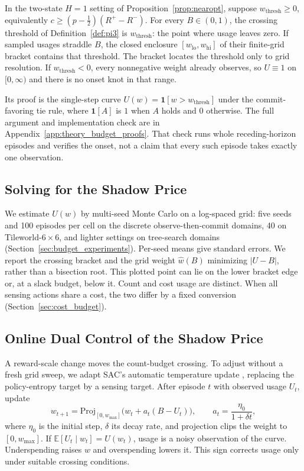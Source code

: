 \documentclass[runningheads]{llncs}
\begin{document}
\begin{corollary}
\label{cor:pi4}
In the two-state $H{=}1$ setting of Proposition~\ref{prop:nearopt}, suppose $w_{\mathrm{thresh}}\geq0$, equivalently $c\geq(p-\tfrac12)(R^+-R^-)$. For every $B\in(0,1)$, the crossing threshold of Definition~\ref{def:pi3} is $w_{\mathrm{thresh}}$: the point where usage leaves zero. If sampled usages straddle $B$, the closed enclosure $[w_{\mathrm{lo}},w_{\mathrm{hi}}]$ of their finite-grid bracket contains that threshold. The bracket locates the threshold only to grid resolution. If $w_{\mathrm{thresh}}<0$, every nonnegative weight already observes, so $U\equiv1$ on $[0,\infty)$ and there is no onset knot in that range.
\end{corollary}

Its proof is the single-step curve $U(w)=\mathbf{1}[w>w_{\mathrm{thresh}}]$ under the commit-favoring tie rule, where $\mathbf{1}[A]$ is $1$ when $A$ holds and $0$ otherwise. The full argument and implementation check are in Appendix~\ref{app:theory_budget_proofs}. That check runs whole receding-horizon episodes and verifies the onset, not a claim that every such episode takes exactly one observation.

\subsection{Solving for the Shadow Price}
\label{sec:budget_solve}

We estimate $U(w)$ by multi-seed Monte Carlo on a log-spaced grid: five seeds and 100 episodes per cell on the discrete observe-then-commit domains, 40 on Tileworld-$6\times6$, and lighter settings on tree-search domains (Section~\ref{sec:budget_experiments}). Per-seed means give standard errors. We report the crossing bracket and the grid weight $\hat w(B)$ minimizing $|U-B|$, rather than a bisection root. This plotted point can lie on the lower bracket edge or, at a slack budget, below it. Count and cost usage are distinct. When all sensing actions share a cost, the two differ by a fixed conversion (Section~\ref{sec:cost_budget}).

\subsection{Online Dual Control of the Shadow Price}
\label{sec:pi5}

A reward-scale change moves the count-budget crossing. To adjust without a fresh grid sweep, we adapt SAC's automatic temperature update \citep{haarnoja2018sac}, replacing the policy-entropy target by a sensing target. After episode $t$ with observed usage $U_t$, update
\begin{equation}
\label{eq:dual_update}
w_{t+1}=\mathrm{Proj}_{[0,w_{\max}]}\big(w_t+a_t(B-U_t)\big),\qquad a_t=\frac{\eta_0}{1+\delta t},
\end{equation}
where $\eta_0$ is the initial step, $\delta$ its decay rate, and projection clips the weight to $[0,w_{\max}]$. If $\mathbb E[U_t\mid w_t]=U(w_t)$, usage is a noisy observation of the curve. Underspending raises $w$ and overspending lowers it. This sign corrects usage only under suitable crossing conditions.
\end{document}

